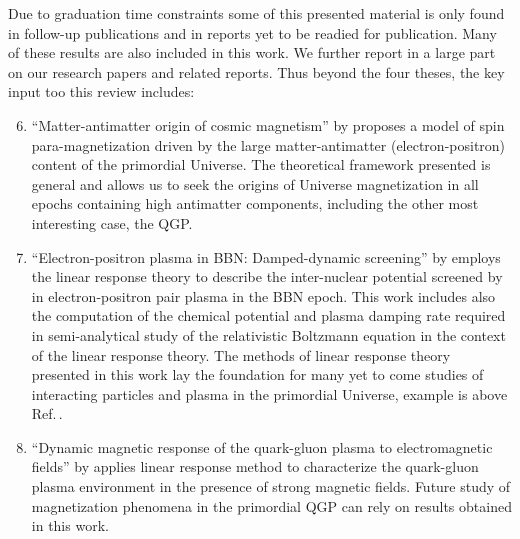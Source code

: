 Due to graduation time constraints some of this presented material is only found in follow-up publications and in reports yet to be readied for publication. Many of these results are also included in this work. We further report in a large part on our research papers and related reports. Thus beyond the four theses, the key input too this review includes:
\begin{enumerate}
\setcounter{enumi}{5}
%
\item ``Matter-antimatter origin of cosmic magnetism'' by  proposes a model of spin para-magnetization driven by the large matter-antimatter (electron-positron) content of the primordial Universe. {\color{black} The theoretical framework presented is general and allows us to seek the origins of Universe magnetization in all epochs containing high antimatter components, including the other most interesting case, the QGP.}
%
\item ``Electron-positron plasma in BBN: Damped-dynamic screening'' by  employs the linear response theory to describe the inter-nuclear potential screened by in electron-positron pair plasma in the BBN epoch. This work includes also the computation of the chemical potential and plasma damping rate required in semi-analytical study of the relativistic Boltzmann equation in the context of the linear response theory. {\color{black} The methods of linear response theory presented in this work lay the foundation for many yet to come studies of interacting particles and plasma in the primordial Universe, example is above Ref.\,\cite{Grayson:2024uwg}.}
%
\item ``Dynamic magnetic response of the quark-gluon plasma to electromagnetic fields'' by  applies linear response method to characterize the quark-gluon plasma environment in the presence of strong magnetic fields. {\color{black} Future study of magnetization phenomena in the primordial QGP can rely on results obtained in this work.}

\end{enumerate}
